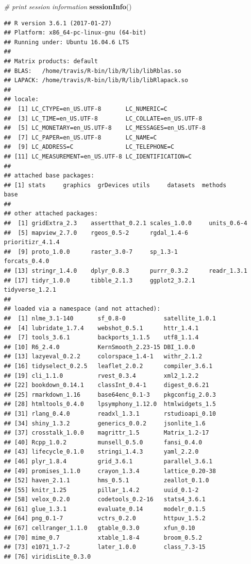 \documentclass[12pt,]{book}
\newenvironment{Shaded}{\begin{snugshade}}{\end{snugshade}}
\newcommand{\KeywordTok}[1]{\textcolor[rgb]{0.13,0.29,0.53}{\textbf{#1}}}
\newcommand{\CommentTok}[1]{\textcolor[rgb]{0.56,0.35,0.01}{\textit{#1}}}
\newcommand{\NormalTok}[1]{#1}
\begin{document}
\begin{Shaded}
\begin{Highlighting}[]
\CommentTok{# print session information}
\KeywordTok{sessionInfo}\NormalTok{()}
\end{Highlighting}
\end{Shaded}

\begin{verbatim}
## R version 3.6.1 (2017-01-27)
## Platform: x86_64-pc-linux-gnu (64-bit)
## Running under: Ubuntu 16.04.6 LTS
## 
## Matrix products: default
## BLAS:   /home/travis/R-bin/lib/R/lib/libRblas.so
## LAPACK: /home/travis/R-bin/lib/R/lib/libRlapack.so
## 
## locale:
##  [1] LC_CTYPE=en_US.UTF-8       LC_NUMERIC=C              
##  [3] LC_TIME=en_US.UTF-8        LC_COLLATE=en_US.UTF-8    
##  [5] LC_MONETARY=en_US.UTF-8    LC_MESSAGES=en_US.UTF-8   
##  [7] LC_PAPER=en_US.UTF-8       LC_NAME=C                 
##  [9] LC_ADDRESS=C               LC_TELEPHONE=C            
## [11] LC_MEASUREMENT=en_US.UTF-8 LC_IDENTIFICATION=C       
## 
## attached base packages:
## [1] stats     graphics  grDevices utils     datasets  methods   base     
## 
## other attached packages:
##  [1] gridExtra_2.3    assertthat_0.2.1 scales_1.0.0     units_0.6-4     
##  [5] mapview_2.7.0    rgeos_0.5-2      rgdal_1.4-6      prioritizr_4.1.4
##  [9] proto_1.0.0      raster_3.0-7     sp_1.3-1         forcats_0.4.0   
## [13] stringr_1.4.0    dplyr_0.8.3      purrr_0.3.2      readr_1.3.1     
## [17] tidyr_1.0.0      tibble_2.1.3     ggplot2_3.2.1    tidyverse_1.2.1 
## 
## loaded via a namespace (and not attached):
##  [1] nlme_3.1-140       sf_0.8-0           satellite_1.0.1   
##  [4] lubridate_1.7.4    webshot_0.5.1      httr_1.4.1        
##  [7] tools_3.6.1        backports_1.1.5    utf8_1.1.4        
## [10] R6_2.4.0           KernSmooth_2.23-15 DBI_1.0.0         
## [13] lazyeval_0.2.2     colorspace_1.4-1   withr_2.1.2       
## [16] tidyselect_0.2.5   leaflet_2.0.2      compiler_3.6.1    
## [19] cli_1.1.0          rvest_0.3.4        xml2_1.2.2        
## [22] bookdown_0.14.1    classInt_0.4-1     digest_0.6.21     
## [25] rmarkdown_1.16     base64enc_0.1-3    pkgconfig_2.0.3   
## [28] htmltools_0.4.0    lpsymphony_1.12.0  htmlwidgets_1.5   
## [31] rlang_0.4.0        readxl_1.3.1       rstudioapi_0.10   
## [34] shiny_1.3.2        generics_0.0.2     jsonlite_1.6      
## [37] crosstalk_1.0.0    magrittr_1.5       Matrix_1.2-17     
## [40] Rcpp_1.0.2         munsell_0.5.0      fansi_0.4.0       
## [43] lifecycle_0.1.0    stringi_1.4.3      yaml_2.2.0        
## [46] plyr_1.8.4         grid_3.6.1         parallel_3.6.1    
## [49] promises_1.1.0     crayon_1.3.4       lattice_0.20-38   
## [52] haven_2.1.1        hms_0.5.1          zeallot_0.1.0     
## [55] knitr_1.25         pillar_1.4.2       uuid_0.1-2        
## [58] velox_0.2.0        codetools_0.2-16   stats4_3.6.1      
## [61] glue_1.3.1         evaluate_0.14      modelr_0.1.5      
## [64] png_0.1-7          vctrs_0.2.0        httpuv_1.5.2      
## [67] cellranger_1.1.0   gtable_0.3.0       xfun_0.10         
## [70] mime_0.7           xtable_1.8-4       broom_0.5.2       
## [73] e1071_1.7-2        later_1.0.0        class_7.3-15      
## [76] viridisLite_0.3.0
\end{verbatim}


\end{document}

